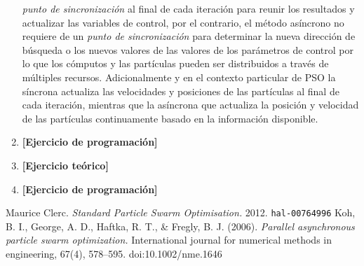 \documentclass[10pt, letterpaper]{article}
\theoremstyle{definition}
\begin{document}
\begin{enumerate}
        \textit{punto de sincronización} al final de cada iteración para reunir
        los resultados y actualizar las variables de control, por el contrario,
        el método asíncrono no requiere de un \textit{punto de sincronización}
        para determinar la nueva dirección de búsqueda o los nuevos valores de
        las valores de los parámetros de control por lo que los cómputos y las
        partículas pueden ser distribuidos a través de múltiples recursos.
        Adicionalmente y en el contexto particular de PSO la síncrona
        actualiza las velocidades y posiciones de las partículas al final de cada
        iteración, mientras que la asíncrona que actualiza la posición y velocidad
        de las partículas continuamente basado en la información disponible.
    \item \textbf{[Ejercicio de programación]}
    \item \textbf{[Ejercicio teórico]}
    \item \textbf{[Ejercicio de programación]}
\end{enumerate}


\clearpage
\begin{thebibliography}{9}
        Maurice Clerc.
        \textit{Standard Particle Swarm Optimisation.}
        2012. \texttt{hal-00764996}
        Koh, B. I., George, A. D., Haftka, R. T., \& Fregly, B. J. (2006).
        \textit{Parallel asynchronous particle swarm optimization.}
        International journal for numerical methods in engineering,
        67(4), 578–595. doi:10.1002/nme.1646
\end{thebibliography}
\end{document}
